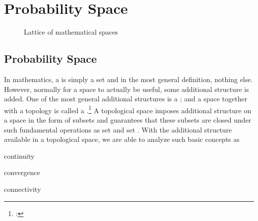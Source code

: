 ﻿%

\chapter{Probability Space}
\label{chp:prbspace}

\begin{figure}[th]
  \centering
  
  \caption{Lattice of mathematical spaces\label{fig:vector_spaces}}
\end{figure}%




\section{Probability Space}
In mathematics, a  is simply a set and in the most general definition,
nothing else.
However, normally for a space to actually be useful, some additional structure is added.
One of the most general additional structures is a ;
and a space together with a topology is called a
.\footnote{: }
A topological space imposes additional structure on a space  in the form of subsets
and guarantees that these subsets are closed under such fundamental operations as
set  and set .
With the additional structure available in a topological space, we are able to
analyze such basic concepts as
  \begin{liste}
    \item continuity
    \item convergence
    \item connectivity
  \end{liste}

